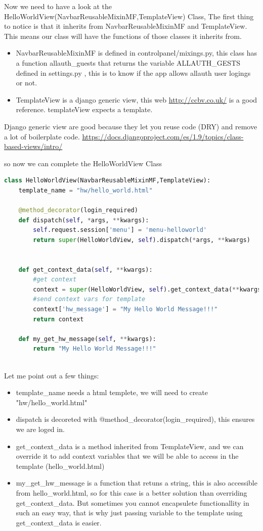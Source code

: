 Now we need to have a look at the HelloWorldView(NavbarReusableMixinMF,TemplateView) Class,
The first thing to notice is that it inherits from NavbarReusableMixinMF and TemplateView.
This means our class will have the functions of those classes it inherits from.

\begin{itemize}
\item  NavbarReusableMixinMF is defined in controlpanel/mixings.py, this class has a function allauth\_guests that returns the variable ALLAUTH\_GESTS defined in settings.py , this is to know if the app allows allauth user logings or not.
\item  TemplateView is a django generic view, this web \url{http://ccbv.co.uk/} is a good reference. templateView expects a template.
\end{itemize}

Django generic view are good because they let you reuse code (DRY) and 
remove a lot of boilerplate code.
\url{https://docs.djangoproject.com/es/1.9/topics/class-based-views/intro/}

so now we can complete the HelloWorldView Class

\begin{lstlisting}[language=Python,firstnumber=1]
class HelloWorldView(NavbarReusableMixinMF,TemplateView):
	template_name = "hw/hello_world.html"

	@method_decorator(login_required)
	def dispatch(self, *args, **kwargs):
		self.request.session['menu'] = 'menu-helloworld'
		return super(HelloWorldView, self).dispatch(*args, **kwargs)


	def get_context_data(self, **kwargs):
		#get context
		context = super(HelloWorldView, self).get_context_data(**kwargs)
		#send context vars for template
		context['hw_message'] = "My Hello World Message!!!"
		return context
		
	def my_get_hw_message(self, **kwargs):
		return "My Hello World Message!!!"
		
\end{lstlisting}

Let me point out a few things:

\begin{itemize}
\item  template\_name needs a html templete, we will need to create "hw/hello\_world.html"
\item  dispatch is decoreted with @method\_decorator(login\_required), 
this ensures we are loged in.

\item  get\_context\_data is a method inherited from TemplateView, and we can override it to add context variables that we will be able to access in the template (hello\_world.html)

\item  my\_get\_hw\_message is a function that retuns a string, this is also accessible from hello\_world.html, so for this case is a better solution than overriding get\_context\_data.
But sometimes you cannot encapsulete functionallity in such an easy way, that is why just passing variable to the template using get\_context\_data is easier.

\end{itemize}


